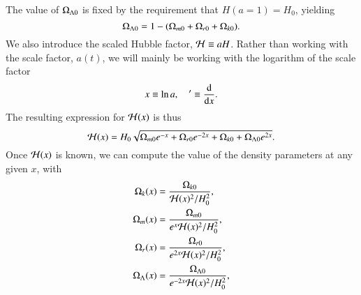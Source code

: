 The value of $\Omega_{\Lambda 0}$ is fixed by the requirement that $H(a=1)=H_0$, yielding 
\begin{equation}
    \Omega_{\Lambda 0} = 1 - (\Omega_{m0} + \Omega_{r0} + \Omega_{k0}). \label{eq:M1:theory:omega_lambda_0_normalization_condition}
\end{equation}
%
We also introduce the scaled Hubble factor, $\mathcal{H}\equiv aH$. Rather than working with the scale factor, $a(t)$, we will mainly be working with the logarithm of the scale factor 
\begin{equation} \label{eq:M1:theory:x_dx_definitions}
    x\equiv \ln a,\quad '\equiv \dv{x}. 
\end{equation}
%
%
The resulting expression for $\mathcal{H}(x)$ is thus  
\begin{equation} \label{eq:M1:theory:Hp_of_x}
    \mathcal{H}(x) = H_0 \sqrt{\Omega_{m0} e^{-x} + \Omega_{r0} e^{-2x} + \Omega_{k0} + \Omega_{\Lambda 0} e^{2x}}. 
\end{equation}
%
Once $\mathcal{H}(x)$ is known, we can compute the value of the density parameters at any given $x$, with 
\begin{align}
    \Omega_{k}(x) &= \frac{\Omega_{k0}}{\mathcal{H}(x)^2 / H_0^2}, \label{eq:M1:theory:omega_k_of_x}\\ 
    \Omega_{m}(x) &= \frac{\Omega_{m0}}{e^x \mathcal{H}(x)^2 / H_0^2}, \label{eq:M1:theory:omega_m_of_x}\\ 
    \Omega_{r}(x) &= \frac{\Omega_{r0}}{e^{2x} \mathcal{H}(x)^2 / H_0^2}, \label{eq:M1:theory:omega_r_of_x}\\ 
    \Omega_{\Lambda}(x) &= \frac{\Omega_{\Lambda 0}}{e^{-2x} \mathcal{H}(x)^2 / H_0^2}, \label{eq:M1:theory:omega_L_of_x}    
\end{align}


